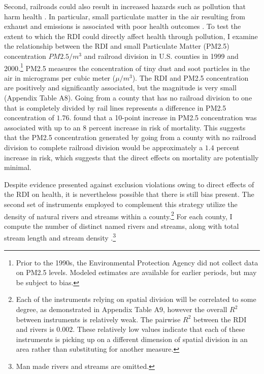 \documentclass[11pt]{article}
\begin{document}
Second, railroads could also result in increased hazards such as pollution that harm health \citep{dockery_association_1993}. In particular, small particulate matter in the air resulting from exhaust and emissions is associated with poor health outcomes \citep{sangkham_update_2024}. To test the extent to which the RDI could directly affect health through pollution, I examine the relationship between the RDI and small Particulate Matter (PM2.5) concentration $PM2.5/m^3$ and railroad division in U.S. counties in 1999 and 2000.\footnote{Prior to the 1990s, the Environmental Protection Agency did not collect data on PM2.5 levels. Modeled estimates are available for earlier periods, but may be subject to bias.} PM2.5 measures the concentration of tiny dust and soot particles in the air in micrograms per cubic meter ($\mu /m^3$). The RDI and PM2.5 concentration are positively and significantly associated, but the magnitude is very small (Appendix Table A8). Going from a county that has no railroad division to one that is completely divided by rail lines represents a difference in PM2.5 concentration of $1.76$. \citet{pope_lung_2002} found that a 10-point increase in PM2.5 concentration was associated with up to an 8 percent increase in risk of mortality. This suggests that the PM2.5 concentration generated by going from a county with no railroad division to complete railroad division would be approximately a $1.4$ percent increase in risk, which suggests that the direct effects on mortality are potentially minimal.

Despite evidence presented against exclusion violations owing to direct effects of the RDI on health, it is nevertheless possible that there is still bias present. The second set of instruments employed to complement this strategy utilize the density of natural rivers and streams within a county.\footnote{Each of the instruments relying on spatial division will be correlated to some degree, as demonstrated in Appendix Table A9, however the overall $R^2$ between instruments is relatively weak. The pairwise $R^2$ between the RDI and rivers is $0.002$. These relatively low values indicate that each of these instruments is picking up on a different dimension of spatial division in an area rather than substituting for another measure.} For each county, I compute the number of distinct named rivers and streams, along with total stream length and stream density \citep{trounstine_segregation_2016}.\footnote{Man made rivers and streams are omitted.}
\end{document}

